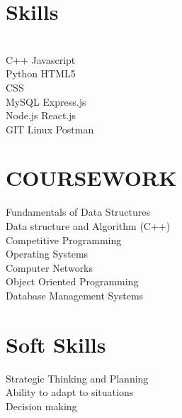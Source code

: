 \documentclass[]{deedy-resume-openfont}
\begin{document}
\begin{minipage}[t]{0.33\textwidth}
\section{Skills}
\\
 \textbullet{} C++ \textbullet{} Javascript \\
  \textbullet{} Python \textbullet{}  HTML5 \\ \textbullet{}CSS 
   \\

 \textbullet{} MySQL 
\textbullet{}Express.js  \\ \textbullet{} Node.js
\textbullet{} React.js\\  
 
 
 \textbullet{} GIT \textbullet{}Linux \textbullet{}Postman
\sectionsep


\section{COURSEWORK}
\textbullet{}Fundamentals of Data Structures\\
\textbullet{}Data structure and Algorithm (C++) \\
\textbullet{}Competitive Programming\\
\textbullet{}Operating Systems\\
\textbullet{}Computer Networks\\
\textbullet{}Object Oriented Programming\\
\textbullet{}Database Management Systems\\







 \section{Soft Skills}
 \textbullet{}Strategic Thinking and Planning\\
\textbullet{}Ability to adapt to situations\\
 \textbullet{}Decision making
 \sectionsep
%
%

\end{minipage} 
\end{document}
